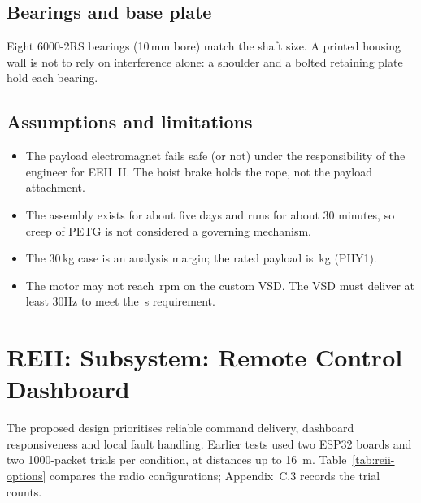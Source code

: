 \subsection{Bearings and base plate}
Eight 6000-2RS bearings (10\,mm bore) match the shaft size. A printed housing wall is
not to rely on interference alone: a shoulder and a bolted retaining plate hold each
bearing.
 
\subsection{Assumptions and limitations}
\begin{itemize}
    \item The payload electromagnet fails safe (or not) under the responsibility of the
          engineer for EEII~II. The hoist brake holds the rope, not the payload attachment.
    \item The assembly exists for about five days and runs for about 30 minutes, so
          creep of PETG is not considered a governing mechanism.
    \item The 30\,kg case is an analysis margin; the rated payload is \InMassRated\,kg (PHY1).
    \item The motor may not reach \InMotorN\,rpm on the custom VSD.  The VSD must deliver at least 30Hz to meet
          the \InTimeReq\,s requirement.
\end{itemize}
 

\section{REII: Subsystem: Remote Control Dashboard}
\label{sec:reii-subsystem-remote-control-dashboard}

The proposed design prioritises reliable command delivery,
dashboard responsiveness and local fault handling.
Earlier tests used two ESP32 boards and two 1000-packet trials
per condition, at distances up to 16~m.
Table~\ref{tab:reii-options} compares the radio configurations;
Appendix~C.3 records the trial counts.
\cite{reii_measurements2026}

